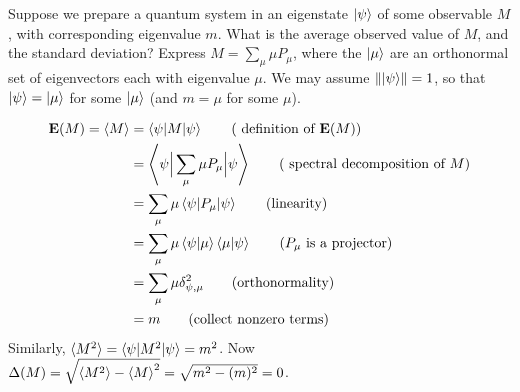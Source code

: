 


 Suppose we prepare a quantum system in an eigenstate $\ket{\psi}$ of some observable $M$, with corresponding eigenvalue $m$.  What is the average observed value of $M$, and the standard deviation?
\Soln Express $M = \sum_\mu \mu P_\mu$, where the $\ket{\mu}$ are an orthonormal set of eigenvectors each with eigenvalue $\mu$. We may assume $\left\lVert\ket{\psi}\right\rVert = 1$, so that $\ket{\psi} = \ket{\mu}$ for some $\ket{\mu}$ (and $m = \mu$ for some $\mu$). 

\begin{align*}
	\mathbf{E}(M) = \braket{M} &= \braket{\psi|M|\psi} \tag{ definition of $\mathbf{E}(M)$}\\
	&= \left\langle \psi \Big\lvert \sum_\mu \mu P_\mu\Big\rvert \psi\right\rangle \tag{ spectral decomposition of $M$}\\
	&=\sum_\mu \mu\braket{\psi|P_\mu|\psi} \tag{linearity}\\
	&=\sum_\mu \mu\braket{\psi|\mu}\braket{\mu|\psi} \tag{$P_\mu$ is a projector}\\
	&=\sum_\mu \mu \delta_{\psi,\mu}^2 \tag{orthonormality}\\
	&=m \tag{collect nonzero terms}
	\end{align*}
Similarly, $\braket{M^2} = \braket{ \psi | M^2 | \psi} = m^2$.  Now $\Delta(M) = \sqrt{\braket{M^2}-\braket{M}^2} = \sqrt{m^2-(m)^2} = 0$.


